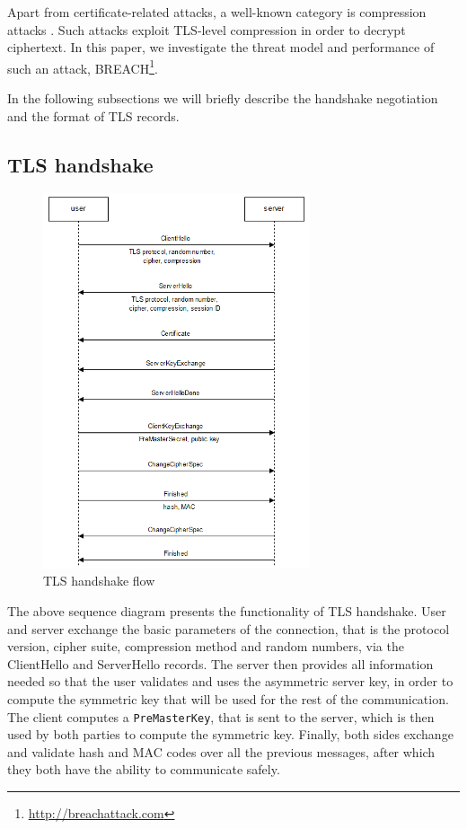 Apart from certificate-related attacks, a well-known category is compression
attacks \cite{compression_attacks}. Such attacks exploit TLS-level compression
in order to decrypt ciphertext. In this paper, we investigate the threat model
and performance of such an attack,
BREACH\footnote{\url{http://breachattack.com}}.

In the following subsections we will briefly describe the handshake negotiation
and the format of TLS records.

\subsection{TLS handshake}

\begin{figure}[H] \caption{TLS handshake flow} \centering
\includegraphics[width=0.7\textwidth]{diagrams/tls_handshake.png}\end{figure}

The above sequence diagram presents the functionality of TLS handshake. User and
server exchange the basic parameters of the connection, that is the protocol
version, cipher suite, compression method and random numbers, via the
ClientHello and ServerHello records. The server then provides all information
needed so that the user validates and uses the asymmetric server key, in order
to compute the symmetric key that will be used for the rest of the
communication. The client computes a \texttt{PreMasterKey}, that is sent to the
server, which is then used by both parties to compute the symmetric key.
Finally, both sides exchange and validate hash and MAC codes over all the
previous messages, after which they both have the ability to communicate safely.

